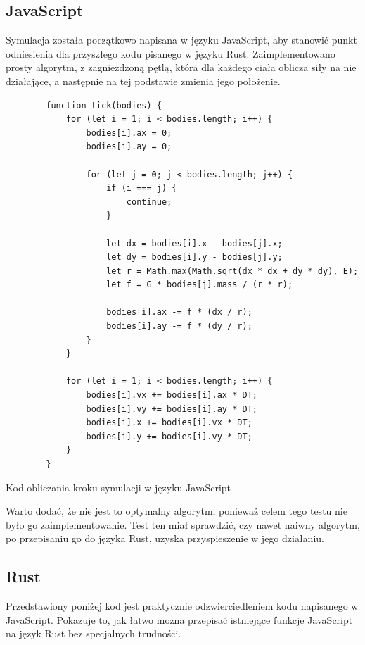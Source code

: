 \documentclass[language=polish,type=master]{aghmodern}
\begin{document}
\clearpage

\subsection{JavaScript}
Symulacja została początkowo napisana w języku JavaScript, aby stanowić punkt odniesienia dla przyszłego kodu pisanego w języku Rust.
Zaimplementowano prosty algorytm, z zagnieżdżoną pętlą, która dla każdego ciała oblicza siły na nie działające, a następnie na tej podstawie zmienia jego położenie.

\begin{listing}[H]
    \begin{verbatim}
        function tick(bodies) {
            for (let i = 1; i < bodies.length; i++) {
                bodies[i].ax = 0;
                bodies[i].ay = 0;

                for (let j = 0; j < bodies.length; j++) {
                    if (i === j) {
                        continue;
                    }

                    let dx = bodies[i].x - bodies[j].x;
                    let dy = bodies[i].y - bodies[j].y;
                    let r = Math.max(Math.sqrt(dx * dx + dy * dy), E);
                    let f = G * bodies[j].mass / (r * r);

                    bodies[i].ax -= f * (dx / r);
                    bodies[i].ay -= f * (dy / r);
                }
            }

            for (let i = 1; i < bodies.length; i++) {
                bodies[i].vx += bodies[i].ax * DT;
                bodies[i].vy += bodies[i].ay * DT;
                bodies[i].x += bodies[i].vx * DT;
                bodies[i].y += bodies[i].vy * DT;
            }
        }
    \end{verbatim}
    \caption{Kod obliczania kroku symulacji w języku JavaScript}
\end{listing}

Warto dodać, że nie jest to optymalny algorytm, ponieważ celem tego testu nie było go zaimplementowanie.
Test ten miał sprawdzić, czy nawet naiwny algorytm, po przepisaniu go do języka Rust, uzyska przyspieszenie w jego działaniu.

\subsection{Rust}
Przedstawiony poniżej kod jest praktycznie odzwierciedleniem kodu napisanego w JavaScript.
Pokazuje to, jak łatwo można przepisać istniejące funkcje JavaScript na język Rust bez specjalnych trudności.
\end{document}
